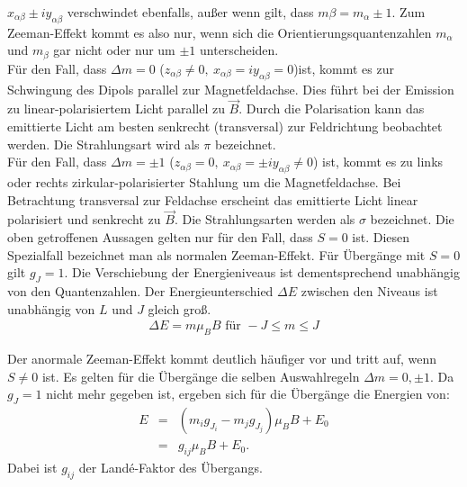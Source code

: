$x_{\alpha\beta}\pm i y_{\alpha\beta}$ verschwindet ebenfalls, außer wenn gilt, dass $m{\beta} = m_{\alpha} \pm 1$.
Zum Zeeman-Effekt kommt es also nur, wenn sich die Orientierungsquantenzahlen $m_{\alpha}$ und $m_{\beta}$ gar nicht oder nur um $\pm 1$ unterscheiden.\\
%
Für den Fall, dass $\Delta m = 0$ ($z_{\alpha\beta} \neq 0,\ x_{\alpha\beta} = i y_{\alpha\beta} = 0$)ist, kommt es zur Schwingung des Dipols parallel zur Magnetfeldachse.
Dies führt bei der Emission zu linear-polarisiertem Licht parallel zu $\vec{B}$.
Durch die Polarisation kann das emittierte Licht am besten senkrecht (transversal) zur Feldrichtung beobachtet werden.
Die Strahlungsart wird als $\pi$ bezeichnet.\\
%
Für den Fall, dass $\Delta m = \pm 1$ ($z_{\alpha\beta} = 0,\ x_{\alpha\beta} = \pm i y_{\alpha\beta} \neq 0$) ist, kommt es zu links oder rechts zirkular-polarisierter Stahlung um die Magnetfeldachse.
Bei Betrachtung transversal zur Feldachse erscheint das emittierte Licht linear polarisiert und senkrecht zu $\vec{B}$.
Die Strahlungsarten werden als $\sigma$ bezeichnet.
%
Die oben getroffenen Aussagen gelten nur für den Fall, dass $S=0$ ist.
Diesen Spezialfall bezeichnet man als normalen Zeeman-Effekt.
Für Übergänge mit $S=0$ gilt $g_J = 1$.
Die Verschiebung der Energieniveaus ist dementsprechend unabhängig von den Quantenzahlen.
Der Energieunterschied $\Delta E$ zwischen den Niveaus ist unabhängig von $L$ und $J$ gleich groß.
\begin{align}
  \Delta E = m \mu_B B \text{ für } -J \leq m \leq J
  \label{eqn:normal}
\end{align}

Der anormale Zeeman-Effekt kommt deutlich häufiger vor und tritt auf, wenn $S \neq 0$ ist.
Es gelten für die Übergänge die selben Auswahlregeln $\Delta m = 0, \pm 1$.
Da $g_J = 1$ nicht mehr gegeben ist, ergeben sich für die Übergänge die Energien von:
\begin{align}
	E &=& (m_ig_{J_i}-m_jg_{J_j})\mu_BB+E_0
  \label{eqn:anormal}\\
    &=& g_{ij}\mu_BB + E_0.
    \label{eqn:allgemein}
\end{align}
Dabei ist $g_{ij}$ der Landé-Faktor des Übergangs.
\FloatBarrier

